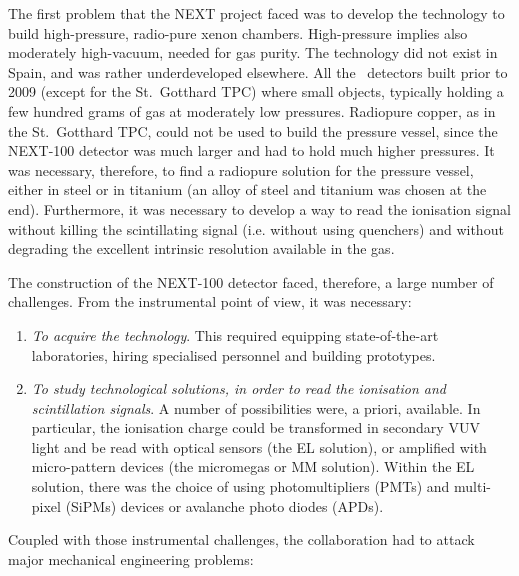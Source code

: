 The first problem that the NEXT project faced was to develop the technology to build high-pressure, radio-pure xenon chambers. High-pressure implies also moderately high-vacuum, needed for gas purity. The technology did not exist in Spain, and was rather underdeveloped elsewhere. All the \HPXE\ detectors built prior to 2009 (except for the St.~Gotthard TPC) where small objects, typically holding a few hundred grams of gas at moderately low pressures. Radiopure copper, as in the St.~Gotthard TPC, could not be used to build the pressure vessel, since the NEXT-100 detector was much larger and had to hold much higher pressures.  It was necessary, therefore, to find a radiopure solution for the pressure vessel, either in steel or in titanium (an alloy of steel and titanium was chosen at the end). Furthermore, it was necessary to develop a way to read the ionisation signal without killing the scintillating signal (i.e. without using quenchers) and without degrading the excellent intrinsic resolution available in the gas. 

The construction of the NEXT-100 detector faced, therefore, a large number of challenges. From the instrumental point of view, it was necessary:

\begin{enumerate}
\item {\em To acquire the technology}. This required equipping state-of-the-art laboratories, hiring specialised personnel and building prototypes.
\item {\em To study technological solutions, in order to read the ionisation and scintillation signals}. A number of possibilities were, a priori, available. In particular, the ionisation charge could be transformed in secondary VUV light and be read with optical sensors (the EL solution), or amplified with micro-pattern devices (the micromegas or MM solution). Within the EL solution, there was the choice of using photomultipliers (PMTs) and multi-pixel (SiPMs) devices or avalanche photo diodes (APDs). 
\end{enumerate}

Coupled with those instrumental challenges, the collaboration had to attack major mechanical engineering problems:

